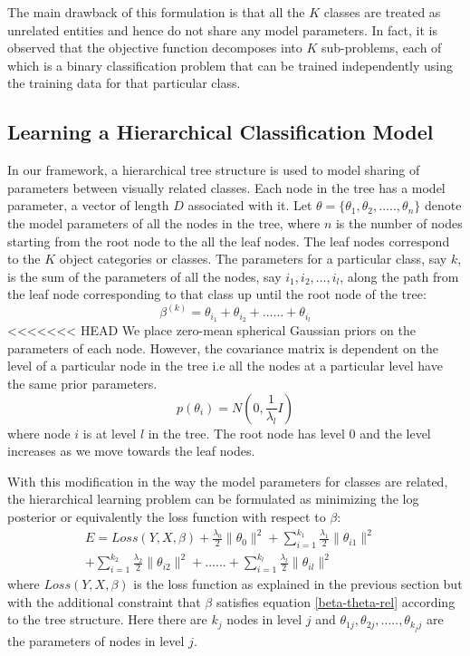 \documentclass[10pt,twocolumn,letterpaper]{article}
\begin{document}
 The main drawback of this formulation is that all the $K$ classes are treated as unrelated entities and hence 
 do not share any model parameters. In fact, it is observed that the objective function decomposes into 
 $K$ sub-problems, each of which is a binary classification problem that can be trained independently 
 using the training data for that particular class.
 
 
 \subsection{Learning a Hierarchical Classification Model}
 In our framework, a hierarchical tree structure is used to model sharing of parameters between 
 visually related classes. Each node in the tree has a model parameter, a vector of length $D$ 
 associated with it.  Let $ \theta = \{ \theta_{1}, \theta_{2},.....,\theta_{n}\} $ denote the model parameters 
 of all the nodes in the tree, where $n$ is the number of nodes starting from the root node to the all the leaf nodes.
 The leaf nodes correspond to the $K$ object categories or classes. The parameters for a particular class, say $k$,
 is the sum of the parameters of all the nodes, say $i_{1}, i_{2}, ..., i_{l} $, along the path from the leaf node
 corresponding to that class up until the root node of the tree:
 \begin{equation}
 \beta^{(k)} = \theta_{i_{1}} +  \theta_{i_{2}} + ...... + \theta_{i_{l}}
  \end{equation} 
<<<<<<< HEAD
 We place zero-mean spherical Gaussian priors on the parameters of each node. However, the 
 covariance matrix is dependent on the level of a particular node in the tree i.e all the nodes at
 a particular level have the same prior parameters.
 \begin{equation}
 p(\theta_{i})  = N(0,\frac{1}{\lambda_{l}}I) 
\end{equation}   
where node $i$ is at level $l$ in the tree. The root node has level 0 and the level increases as 
we move towards the leaf nodes.

With this modification in the way the model parameters for classes are related,  the hierarchical 
learning problem can be formulated as minimizing the log posterior or equivalently the loss function 
with respect to $\beta$:
\begin{equation} \label{hier-loss}
\begin{split}
E = Loss(Y,X,\beta) + \frac{\lambda_{0}}{2} \|\theta_{0} \|^{2} +
\sum_{i=1}^{k_{1}} \frac{\lambda_{1}}{2} \|\theta_{i1} \|^{2} & \\
+ \sum_{i=1}^{k_{2}} \frac{\lambda_{2}}{2} \|\theta_{i2} \|^{2} +
...... +
\sum_{i=1}^{k_{l}} \frac{\lambda_{l}}{2} \|\theta_{il} \|^{2} &
\end{split}
\end{equation} 
 where $Loss(Y,X,\beta)$ is the loss function as explained in the previous section
 but with the additional constraint that $\beta$ satisfies  equation \ref{beta-theta-rel} 
 according to the tree structure. Here there are $k_{j}$ nodes in level $j$ and 
 $\theta_{1j}, \theta_{2j},.....,\theta_{k_{j}j}$ are the parameters of nodes in level $j$.
\end{document}
